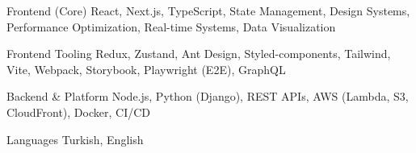 

\begin{cvskills}

\cvskill
{Frontend (Core)}
{React, Next.js, TypeScript, State Management, Design Systems,
 Performance Optimization, Real-time Systems, Data Visualization}


\cvskill
  {Frontend Tooling}
  {Redux, Zustand, Ant Design, Styled-components, Tailwind,
  Vite, Webpack, Storybook, Playwright (E2E), GraphQL} 
  

\cvskill
{Backend \& Platform}
{Node.js, Python (Django), REST APIs, AWS (Lambda, S3, CloudFront), Docker, CI/CD}

  \cvskill
    {Languages} %
    {Turkish, English} %

\end{cvskills}
